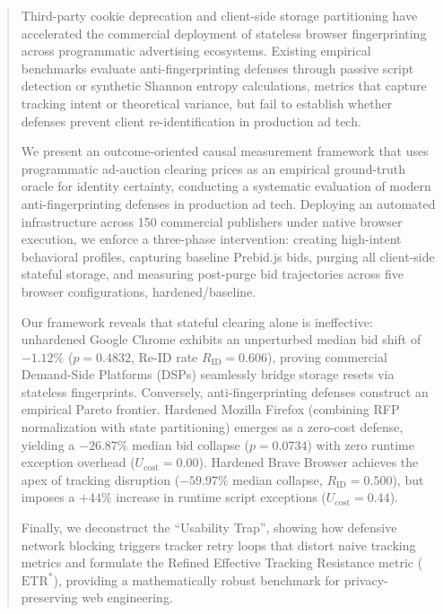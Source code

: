 \begin{abstract}
Third-party cookie deprecation and client-side storage partitioning have accelerated the commercial deployment of stateless browser fingerprinting across programmatic advertising ecosystems. 
Existing empirical benchmarks evaluate anti-fingerprinting defenses through passive script detection or synthetic Shannon entropy calculations, metrics that capture tracking intent or theoretical variance, but fail to establish whether defenses prevent client re-identification in production ad tech.

We present an outcome-oriented causal measurement framework that uses programmatic ad-auction clearing prices as an empirical ground-truth oracle for identity certainty, conducting a systematic evaluation of modern anti-fingerprinting defenses in production ad tech. 
Deploying an automated infrastructure across 150 commercial publishers under native browser execution, we enforce a three-phase intervention: creating high-intent behavioral profiles, capturing baseline Prebid.js bids, purging all client-side stateful storage, and measuring post-purge bid trajectories across five browser configurations, hardened/baseline.

Our framework reveals that stateful clearing alone is ineffective: unhardened Google Chrome exhibits an unperturbed median bid shift of $-1.12\%$ ($p = 0.4832$, Re-ID rate $R_{\text{ID}} = 0.606$), proving commercial Demand-Side Platforms (DSPs) seamlessly bridge storage resets via stateless fingerprints. 
Conversely, anti-fingerprinting defenses construct an empirical Pareto frontier. Hardened Mozilla Firefox (combining RFP normalization with state partitioning) emerges as a zero-cost defense, yielding a $-26.87\%$ median bid collapse ($p = 0.0734$) with zero runtime exception overhead ($U_{\text{cost}} = 0.00$). 
Hardened Brave Browser achieves the apex of tracking disruption ($-59.97\%$ median collapse, $R_{\text{ID}} = 0.500$), but imposes a $+44\%$ increase in runtime script exceptions ($U_{\text{cost}} = 0.44$).

Finally, we deconstruct the ``Usability Trap'', showing how defensive network blocking triggers tracker retry loops that distort naive tracking metrics and formulate the Refined Effective Tracking Resistance metric ($\text{ETR}^*$), providing a mathematically robust benchmark for privacy-preserving web engineering.
\end{abstract}